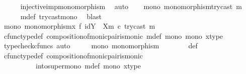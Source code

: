 \begin{isabellebody}
\ \ \ \ \isamarkupfalse%
\ injective{\isacharunderscore}{\kern0pt}imp{\isacharunderscore}{\kern0pt}monomorphism\ \isamarkupfalse%
\ auto\isanewline
\ \ \isamarkupfalse%
\ mono{}{\isacharcolon}{\kern0pt}\ {\isachardoublequoteopen}monomorphism{\isacharparenleft}{\kern0pt}try{\isacharunderscore}{\kern0pt}cast\ m{\isacharparenright}{\kern0pt}{\isachardoublequoteclose}\isanewline
\ \ \ \ \isamarkupfalse%
\ m{\isacharunderscore}{\kern0pt}def\ try{\isacharunderscore}{\kern0pt}cast{\isacharunderscore}{\kern0pt}mono\ \isamarkupfalse%
\ blast\isanewline
\ \ \isamarkupfalse%
\ mono{}{\isacharcolon}{\kern0pt}\ {\isachardoublequoteopen}monomorphism{\isacharparenleft}{\kern0pt}{\isacharparenleft}{\kern0pt}x\ {\isasymbowtie}\isactrlsub f\ id{\isacharparenleft}{\kern0pt}Y\ {\isasymsetminus}\ {\isacharparenleft}{\kern0pt}X{\isacharcomma}{\kern0pt}m{\isacharparenright}{\kern0pt}{\isacharparenright}{\kern0pt}{\isacharparenright}{\kern0pt}\ {\isasymcirc}\isactrlsub c\ try{\isacharunderscore}{\kern0pt}cast\ m{\isacharparenright}{\kern0pt}{\isachardoublequoteclose}\isanewline
\ \ \ \ \isamarkupfalse%
\ cfunc{\isacharunderscore}{\kern0pt}type{\isacharunderscore}{\kern0pt}def\ composition{\isacharunderscore}{\kern0pt}of{\isacharunderscore}{\kern0pt}monic{\isacharunderscore}{\kern0pt}pair{\isacharunderscore}{\kern0pt}is{\isacharunderscore}{\kern0pt}monic\ m{\isacharunderscore}{\kern0pt}def\ mono{}\ mono{}\ x{\isacharunderscore}{\kern0pt}type\ \isamarkupfalse%
\ {\isacharparenleft}{\kern0pt}typecheck{\isacharunderscore}{\kern0pt}cfuncs{\isacharcomma}{\kern0pt}\ auto{\isacharparenright}{\kern0pt}\isanewline
\ \ \isamarkupfalse%
\ \isamarkupfalse%
\ {\isasymphi}{\isacharunderscore}{\kern0pt}mono{\isacharcolon}{\kern0pt}\ {\isachardoublequoteopen}monomorphism\ {\isasymphi}{\isachardoublequoteclose}\ \isanewline
\ \ \ \ \isamarkupfalse%
\ {\isasymphi}{\isacharunderscore}{\kern0pt}def\isanewline
\ \ \ \ \isamarkupfalse%
\ cfunc{\isacharunderscore}{\kern0pt}type{\isacharunderscore}{\kern0pt}def\ composition{\isacharunderscore}{\kern0pt}of{\isacharunderscore}{\kern0pt}monic{\isacharunderscore}{\kern0pt}pair{\isacharunderscore}{\kern0pt}is{\isacharunderscore}{\kern0pt}monic\ \isanewline
\ \ \ \ \ \ \ \ \ \ into{\isacharunderscore}{\kern0pt}super{\isacharunderscore}{\kern0pt}mono\ m{\isacharunderscore}{\kern0pt}def\ mono{}\ x{\isacharunderscore}{\kern0pt}type\ \isamarkupfalse%

\end{isabellebody}
